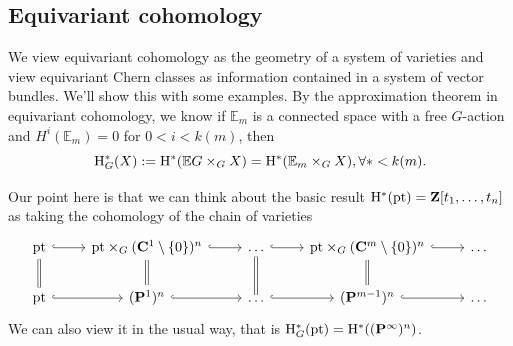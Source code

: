\documentclass[../main.tex]{subfiles}
\begin{document}
\subsection{Equivariant cohomology}
We view equivariant cohomology as the geometry of a system of varieties and view equivariant Chern classes as information contained in a system of vector bundles. We'll show this with some examples. By the approximation theorem in equivariant cohomology, we know if $\mathbb{E}_{m}$ is a connected space with a free $G$-action and $H^{i}(\mathbb{E}_{m})=0$ for $0<i<k(m)$, then 
$$\mathrm{H}_{G}^{*}(X):=\mathrm{H}^{*}(\mathbb{E}G\times_{G}X)=\mathrm{H}^{*}(\mathbb{E}_{m}\times_{G}X), \forall *<k(m).$$
\begin{example}[$G=(\C^{\times})^{n}, X=\mathrm{pt}$]
Our point here is that we can think about the basic result $\mathrm{H}^{*}(\mathrm{pt})=\mathbf{Z}[t_{1}, \dots, t_{n}]$ as taking the cohomology of the chain of varieties
$$
\begin{tikzcd}
\mathrm{pt}\arrow[equal]{d} \arrow[hookrightarrow]{r} 
  & \mathrm{pt}\times_{G}(\C^{1}\setminus\{0\})^{n}\arrow[hookrightarrow]{r}\arrow[equal]{d} 
  & \dots \arrow[hookrightarrow]{r}\arrow[equal]{d} 
  & \mathrm{pt}\times_{G}(\C^{m}\setminus\{0\})^{n}\arrow[hookrightarrow]{r}\arrow[equal]{d}
  & \dots \\
\mathrm{pt} \arrow[hookrightarrow]{r} 
  & (\P^{1})^{n}\arrow[hookrightarrow]{r} 
  & \dots\arrow[hookrightarrow]{r}
  & (\P^{m-1})^{n}\arrow[hookrightarrow]{r}
  & \dots 
\end{tikzcd}
$$
We can also view it in the usual way, that is $\mathrm{H}^{*}_{G}(\mathrm{pt})=\mathrm{H}^{*}((\mathbf{P}^{\infty})^{n})$.
\end{example}
\end{document}
